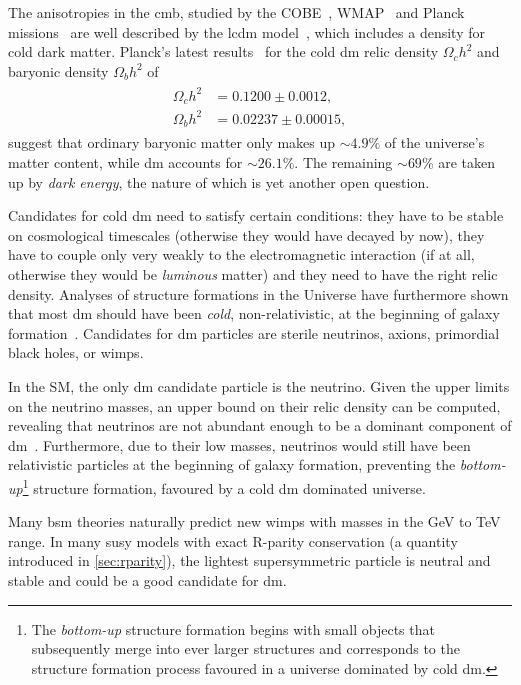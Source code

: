 The anisotropies in the \gls{cmb}, studied by the COBE~\cite{Bennett:1996ce,COBE}, WMAP~\cite{WMAP2,WMAP1} and Planck missions~\cite{Planck} are well described by the \gls{lcdm} model~\cite{Liddle:1976476}, which includes a density for cold dark matter. Planck's latest results~\cite{Aghanim:2018eyx} for the cold \gls{dm} relic density $\Omega_c h^2$ and baryonic density $\Omega_b h^2$ of
\begin{align}
\begin{split}
	\Omega_c h^2 &= 0.1200\pm0.0012, \\
	\Omega_b h^2 &= 0.02237\pm0.00015,
\end{split}
\end{align}
suggest that ordinary baryonic matter only makes up $\sim 4.9\%$ of the universe's matter content, while \gls{dm} accounts for $\sim 26.1\%$. The remaining $\sim 69\%$ are taken up by \textit{dark energy}, the nature of which is yet another open question.

Candidates for cold \gls{dm} need to satisfy certain conditions: they have to be stable on cosmological timescales (otherwise they would have decayed by now), they have to couple only very weakly to the electromagnetic interaction (if at all, otherwise they would be \textit{luminous} matter) and they need to have the right relic density. Analyses of structure formations in the Universe have furthermore shown that most \gls{dm} should have been \textit{cold}, \ie non-relativistic, at the beginning of galaxy formation~\cite{Bertone:2004pz}. Candidates for \gls{dm} particles are \eg sterile neutrinos, axions, primordial black holes, or \glspl{wimp}.

In the SM, the only \gls{dm} candidate particle is the neutrino. Given the upper limits on the neutrino masses, an upper bound on their relic density can be computed, revealing that neutrinos are not abundant enough to be a dominant component of \gls{dm}~\cite{Bertone:2004pz}. Furthermore, due to their low masses, neutrinos would still have been relativistic particles at the beginning of galaxy formation, preventing the \textit{bottom-up}\footnote{The \textit{bottom-up} structure formation begins with small objects that subsequently merge into ever larger structures and corresponds to the structure formation process favoured in a universe dominated by cold \gls{dm}.} structure formation, favoured by a cold \gls{dm} dominated universe.

 Many \gls{bsm} theories naturally predict new \glspl{wimp} with masses in the GeV to TeV range. In many \gls{susy} models with exact R-parity conservation (a quantity introduced in \cref{sec:rparity}), the lightest supersymmetric particle is neutral and stable and could be a good candidate for \gls{dm}.

